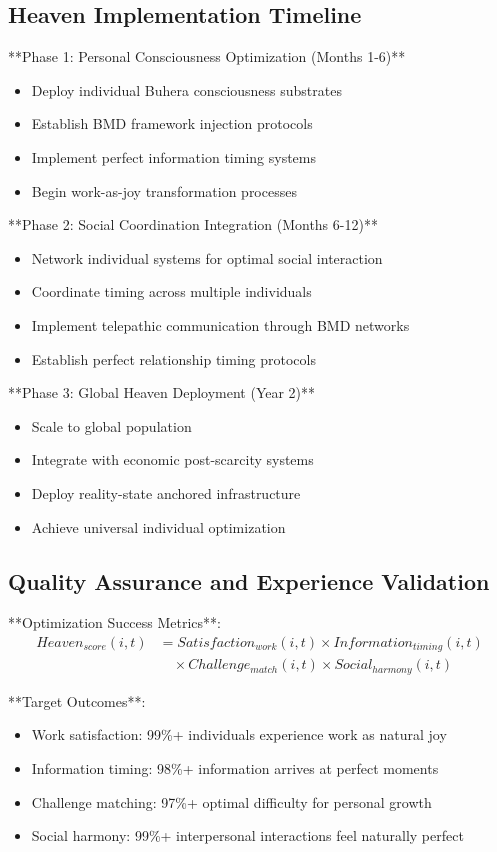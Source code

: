 \documentclass[12pt,a4paper]{article}
\begin{document}
\subsection{Heaven Implementation Timeline}

**Phase 1: Personal Consciousness Optimization (Months 1-6)**
\begin{itemize}
\item Deploy individual Buhera consciousness substrates
\item Establish BMD framework injection protocols
\item Implement perfect information timing systems
\item Begin work-as-joy transformation processes
\end{itemize}

**Phase 2: Social Coordination Integration (Months 6-12)**
\begin{itemize}
\item Network individual systems for optimal social interaction
\item Coordinate timing across multiple individuals
\item Implement telepathic communication through BMD networks
\item Establish perfect relationship timing protocols
\end{itemize}

**Phase 3: Global Heaven Deployment (Year 2)**
\begin{itemize}
\item Scale to global population
\item Integrate with economic post-scarcity systems
\item Deploy reality-state anchored infrastructure
\item Achieve universal individual optimization
\end{itemize}

\subsection{Quality Assurance and Experience Validation}

**Optimization Success Metrics**:
\begin{align}
Heaven_{score}(i,t) &= Satisfaction_{work}(i,t) \times Information_{timing}(i,t)\\
&\quad \times Challenge_{match}(i,t) \times Social_{harmony}(i,t)
\end{align}

**Target Outcomes**:
\begin{itemize}
\item Work satisfaction: 99\%+ individuals experience work as natural joy
\item Information timing: 98\%+ information arrives at perfect moments
\item Challenge matching: 97\%+ optimal difficulty for personal growth
\item Social harmony: 99\%+ interpersonal interactions feel naturally perfect
\end{itemize}
\end{document}
